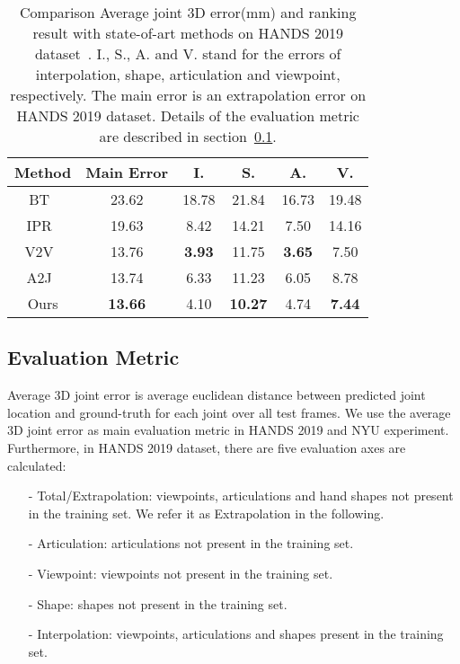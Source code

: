 \documentclass{article}
\begin{document}
\begin{table} \scriptsize
\centering
\begin{tabular}{c|c|c|c|c|c}
\hline
Method & Main Error & I. & S. & A. & V. \\ \hline
BT~\cite{yang2019aligning} & 23.62 & 18.78 & 21.84 & 16.73 & 19.48  \\
IPR~\cite{sun2018integral} & 19.63 & 8.42 & 14.21 & 7.50 & 14.16  \\
V2V~\cite{moon2018v2v} & 13.76 & \textbf{3.93} & 11.75 & \textbf{3.65} & 7.50  \\
A2J~\cite{xiong2019a2j} & 13.74 & 6.33 & 11.23 & 6.05 & 8.78  \\
Ours & \textbf{13.66} & 4.10 & \textbf{10.27} & 4.74 & \textbf{7.44}  \\ 
\hline
\end{tabular}
\caption{Comparison Average joint 3D error(mm) and ranking result with state-of-art methods on HANDS 2019 dataset~\protect\cite{hands2019}. I., S., A. and V. stand for the errors of interpolation, shape, articulation and viewpoint, respectively. The main error is an extrapolation error on HANDS 2019 dataset. Details of the evaluation metric are described in section~\protect\ref{sec:metric}.}
\label{tab:hands19_result} 
\end{table}


\subsection{Evaluation Metric}\label{sec:metric}
 Average 3D joint error is average euclidean distance between predicted joint location and ground-truth for each joint over all test frames. We use the average 3D joint error as main evaluation metric in HANDS 2019 and NYU experiment.
 Furthermore, in HANDS 2019 dataset, there are five evaluation axes are calculated:
\begin{itemize}
\item[-] Total/Extrapolation: viewpoints, articulations and hand shapes not present in the training set. We
refer it as Extrapolation in the following.
\item[-] Articulation: articulations not present in the training set.
\item[-] Viewpoint: viewpoints not present in the training set.
\item[-] Shape: shapes not present in the training set.
\item[-] Interpolation: viewpoints, articulations and shapes present in the training set.
\end{itemize}
\end{document}
